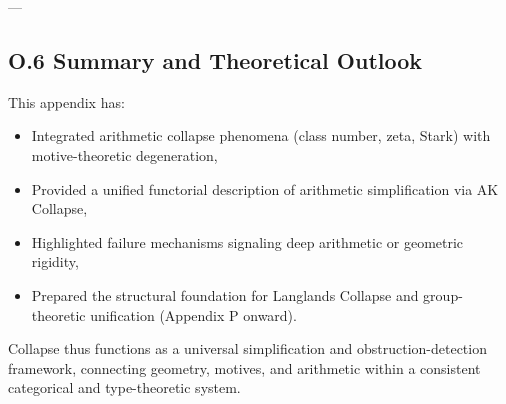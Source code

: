 \documentclass[11pt]{article}
\begin{document}
---

\subsection*{O.6 Summary and Theoretical Outlook}

This appendix has:
\begin{itemize}
  \item Integrated arithmetic collapse phenomena (class number, zeta, Stark) with motive-theoretic degeneration,
  \item Provided a unified functorial description of arithmetic simplification via AK Collapse,
  \item Highlighted failure mechanisms signaling deep arithmetic or geometric rigidity,
  \item Prepared the structural foundation for Langlands Collapse and group-theoretic unification (Appendix P onward).
\end{itemize}

Collapse thus functions as a universal simplification and obstruction-detection framework, connecting geometry, motives, and arithmetic within a consistent categorical and type-theoretic system.
\end{document}
